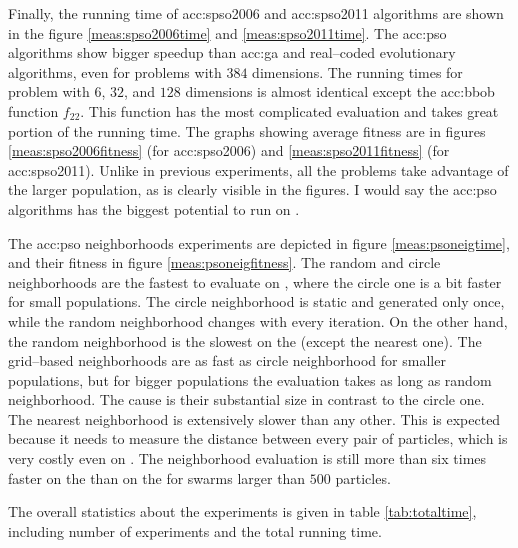 Finally, the running time of \acrshort{acc:spso2006} and \acrshort{acc:spso2011} algorithms are shown in the figure \ref{meas:spso2006time} and \ref{meas:spso2011time}. The \acrshort{acc:pso} algorithms show bigger speedup than \acrshort{acc:ga} and real--coded evolutionary algorithms, even for problems with $384$ dimensions. The running times for problem with $6$, $32$, and $128$ dimensions is almost identical except the \acrshort{acc:bbob} function $f_{22}$. This function has the most complicated evaluation and takes great portion of the running time. The graphs showing average fitness are in figures \ref{meas:spso2006fitness} (for \acrshort{acc:spso2006}) and \ref{meas:spso2011fitness} (for \acrshort{acc:spso2011}). Unlike in previous experiments, all the problems take advantage of the larger population, as is clearly visible in the figures. I would say the \acrshort{acc:pso} algorithms has the biggest potential to run on \gpuns.

The \acrshort{acc:pso} neighborhoods experiments are depicted in figure \ref{meas:psoneigtime}, and their fitness in figure \ref{meas:psoneigfitness}. The random and circle neighborhoods are the fastest to evaluate on \gpuns, where the circle one is a bit faster for small populations. The circle neighborhood is static and generated only once, while the random neighborhood changes with every iteration. On the other hand, the random neighborhood is the slowest on the \cpu (except the nearest one). The grid--based neighborhoods are as fast as circle neighborhood for smaller populations, but for bigger populations the evaluation takes as long as random neighborhood. The cause is their substantial size in contrast to the circle one. The nearest neighborhood is extensively slower than any other. This is expected because it needs to measure the distance between every pair of particles, which is very costly even on \gpuns. The neighborhood evaluation is still more than six times faster on the \gpu than on the \cpu for swarms larger than $500$ particles.

The overall statistics about the experiments is given in table \ref{tab:totaltime}, including number of experiments and the total running time.


